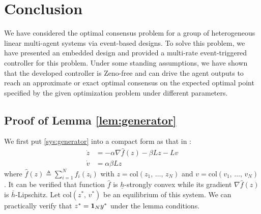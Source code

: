 \documentclass[sort&compress]{IEEEtran}
\begin{document}
%


\section{Conclusion}\label{sec:con}
We have considered the optimal consensus problem for a group of heterogeneous linear multi-agent systems via event-based designs. To solve this problem, we have presented an embedded design and provided a multi-rate event-triggered controller for this problem. Under some standing assumptions, we have shown that the developed controller is Zeno-free and can drive the agent outputs to reach an approximate or exact optimal consensus on the expected optimal point specified by the given optimization problem under different parameters.  

\appendix 

\subsection{Proof of Lemma \ref{lem:generator}}

We first put \eqref{sys:generator} into a compact form as that in \cite{tang2021optimal}: 
\begin{align*}
	\dot{z}&=-\alpha \nabla \hat f(z)- \beta Lz-Lv\\
	\dot{v}&=\alpha \beta L z
\end{align*}
where $\hat f(z)\triangleq \sum_{i=1}^N f_i(z_i)$ with $z=\mbox{col}(z_1,\,\dots,\,z_N)$ and $v=\mbox{col}(v_1,\,\dots,\,v_N)$. It can be verified that function $\hat f$ is $\underline{h}$-strongly convex while its gradient $ \nabla\hat f(z)$ is $\bar h$-Lipschitz. Let $\mbox{col}(z^*,\,v^*)$ be an equilibrium of this system. We can practically verify that $z^*={\bf 1}_N y^*$ under the lemma conditions. 
\end{document}
